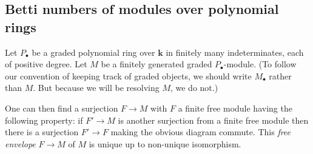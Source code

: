 \documentclass{amsart}
\newcommand{\cut}[1]{}
\theoremstyle{definition}
\theoremstyle{remark}
\def\fieldk{\mathbf{k}}
\begin{document}
\subsection{Betti numbers of modules over polynomial rings}

Let $P_{\bullet}$ be a graded polynomial ring over $\fieldk$ in finitely many indeterminates, each of positive degree.
Let $M$ be a finitely generated graded $P_{\bullet}$-module.  (To follow our convention of keeping track of graded
objects, we should write $M_{\bullet}$ rather than $M$.  But because we will be resolving $M$, we do not.)
\cut{I apologize that I have written $R_{\bullet}$.  It is awkward in this section.}

One can then find a surjection $F \to M$ with $F$ a finite free module having the following property: if $F' \to M$ is
another surjection from a finite free module then there is a surjection $F' \to F$ making the obvious diagram commute.  
This \emph{free envelope} $F \to M$ of $M$ is unique up to non-unique isomorphism.  
\end{document}
